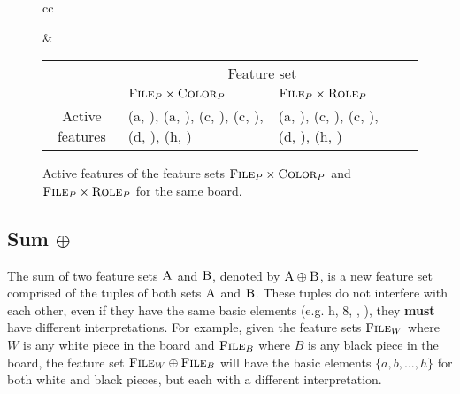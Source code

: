 \begin{figure}[h]
\centering

\begin{tabular}{cc}
\raisebox{-7ex}{
\chessboard[
    tinyboard,
    showmover=false,
    hlabel=false,
    setwhite={kc3, nc2, pa2, Pd4},
    addblack={Kc8,bh7, pa7}
]
}

&

\begin{tabular}{|c|p{4cm}|p{4cm}|p{0cm}}
\cline{2-3}
\multicolumn{1}{c|}{} & \multicolumn{2}{c|}{\centering Feature set} \\
\cline{2-3}
\multicolumn{1}{c|}{} & \centering $\textsc{File}_{P} \times \textsc{Color}_{P}$ & \centering $\textsc{File}_{P} \times \textsc{Role}_{P}$ & \\
\cline{1-3}
Active features &
(a, \white), (a, \black), (c, \black), (c, \white), (d, \white), (h, \black) &
(a, \sympawn), (c, \symking), (c, \symknight), (d, \sympawn), (h, \symbishop) \\
\cline{1-3}
\end{tabular}

\end{tabular}

\caption{Active features of the feature sets $\textsc{File}_{P} \times \textsc{Color}_{P}$ and $\textsc{File}_{P} \times \textsc{Role}_{P}$ for the same board.}
\label{fig:active_features}
\end{figure}


\subsection{Sum $\oplus$}


The sum of two feature sets $\textsc{A}$ and $\textsc{B}$, denoted by $\textsc{A} \oplus \textsc{B}$, is a new feature set comprised of the tuples of both sets $\textsc{A}$ and $\textsc{B}$. These tuples do not interfere with each other, even if they have the same basic elements (e.g. h, 8, \symrook, \black), they \textbf{must} have different interpretations.
For example, given the feature sets $\textsc{File}_{W}$ where $W$ is any white piece in the board and $\textsc{File}_{B}$ where $B$ is any black piece in the board, the feature set $\textsc{File}_{W} \oplus \textsc{File}_{B}$ will have the basic elements $\{a, b, ..., h\}$ for both white and black pieces, but each with a different interpretation.

